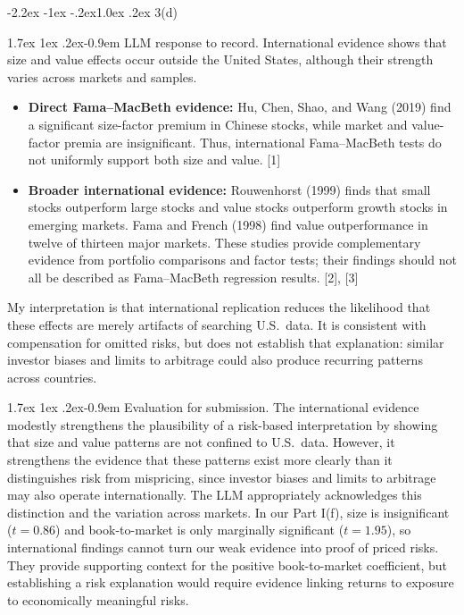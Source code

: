 \documentclass[11pt]{article}
\makeatletter
\renewcommand\subsection{\@startsection{subsection}{2}{0pt}%
  {-2.2ex \@plus -1ex \@minus -.2ex}{1.0ex \@plus .2ex}%
  {\normalfont\bfseries\normalsize\color{psink}}}
\renewcommand\paragraph{\@startsection{paragraph}{4}{0pt}%
  {1.7ex \@plus 1ex \@minus .2ex}{-0.9em}%
  {\normalfont\bfseries\normalsize\color{psink}}}
\newenvironment{tight}
  {\begin{itemize}\setlength{\itemsep}{3pt}\setlength{\parskip}{0pt}%
   \setlength{\topsep}{3pt}\setlength{\leftmargini}{1.4em}}
  {\end{itemize}}
\makeatother
\begin{document}
\subsection{3(d)}

\paragraph{LLM response to record.} International evidence shows that size and
value effects occur outside the United States, although their strength varies
across markets and samples.

\begin{tight}
\item \textbf{Direct Fama--MacBeth evidence:} Hu, Chen, Shao, and Wang (2019)
find a significant size-factor premium in Chinese stocks, while market and
value-factor premia are insignificant. Thus, international Fama--MacBeth tests
do not uniformly support both size and value. [1]
\item \textbf{Broader international evidence:} Rouwenhorst (1999) finds that
small stocks outperform large stocks and value stocks outperform growth stocks
in emerging markets. Fama and French (1998) find value outperformance in twelve
of thirteen major markets. These studies provide complementary evidence from
portfolio comparisons and factor tests; their findings should not all be
described as Fama--MacBeth regression results. [2], [3]
\end{tight}

My interpretation is that international replication reduces the likelihood that
these effects are merely artifacts of searching U.S.\ data. It is consistent
with compensation for omitted risks, but does not establish that explanation:
similar investor biases and limits to arbitrage could also produce recurring
patterns across countries.

\paragraph{Evaluation for submission.} The international evidence modestly
strengthens the plausibility of a risk-based interpretation by showing that size
and value patterns are not confined to U.S.\ data. However, it strengthens the
evidence that these patterns exist more clearly than it distinguishes risk from
mispricing, since investor biases and limits to arbitrage may also operate
internationally. The LLM appropriately acknowledges this distinction and the
variation across markets. In our Part I(f), size is insignificant ($t = 0.86$)
and book-to-market is only marginally significant ($t = 1.95$), so
international findings cannot turn our weak evidence into proof of priced
risks. They provide supporting context for the positive book-to-market
coefficient, but establishing a risk explanation would require evidence linking
returns to exposure to economically meaningful risks.
\end{document}
